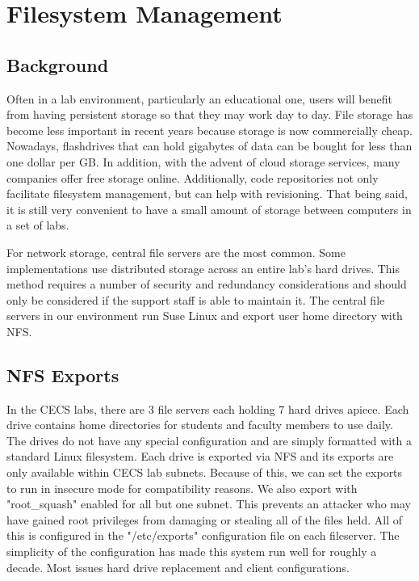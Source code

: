 \section{Filesystem Management} \label{sec:filesystem_management}
\subsection{Background}
Often in a lab environment, particularly an educational one, users will benefit from having persistent storage so that they may work day to day.   File storage has become less important in recent years because storage is now commercially cheap.  Nowadays, flashdrives that can hold gigabytes of data can be bought for less than one dollar per GB.  In addition, with the advent of cloud storage services, many companies offer free storage online.  Additionally, code repositories not only facilitate filesystem management, but can help with revisioning.   That being said, it is still very convenient to have a small amount of storage between computers in a set of labs.  

For network storage, central file servers are the most common.  Some implementations use distributed storage across an entire lab's hard drives.  This method requires a number of security and redundancy considerations and should only be considered if the support staff is able to maintain it.  The central file servers in our environment run Suse Linux and export user home directory with NFS.  

\subsection{NFS Exports}
In the CECS labs, there are 3 file servers each holding 7 hard drives apiece.  Each drive contains home directories for students and faculty members to use daily.  The drives do not have any special configuration and are simply formatted with a standard Linux filesystem.  Each drive is exported via NFS and its exports are only available within CECS lab subnets.  Because of this, we can set the exports to run in insecure mode for compatibility reasons.  We also export with "root\_squash" enabled for all but one subnet.  This prevents an attacker who may have gained root privileges from damaging or stealing all of the files held.  All of this is configured in the "/etc/exports" configuration file on each fileserver.  The simplicity of the configuration has made this system run well for roughly a decade.  Most issues hard drive replacement and client configurations.

